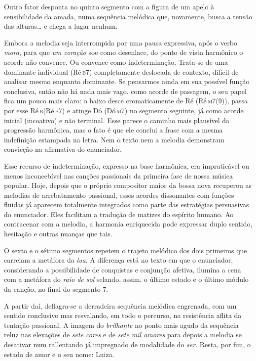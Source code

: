 
Outro fator desponta no quinto segmento com a figura de um apelo à
sensibilidade da amada, numa sequência melódica que, novamente, busca a
tensão das alturas\ldots{} e chega a lugar nenhum.


Embora a melodia seja interrompida por uma pausa expressiva, após o
verbo \textit{mora}, para que \textit{um coração} soe como desenlace, do ponto de
vista harmônico o acorde não convence. Ou convence como indeterminação.
Trata-se de uma dominante individual (Ré\,\textsc{b7}) completamente deslocada de
contexto, difícil de analisar mesmo enquanto dominante. Se pensarmos
ainda em sua possível função conclusiva, então não há nada mais vago.
como acorde de passagem, o seu papel fica um pouco mais claro: o baixo
desce cromaticamente de Ré (Ré\,\textsc{m7(9)}), passa por esse Ré\,\textsc{b}(Ré\,\textsc{b7}) e atinge
Dó (Dó\,\textsc{m7}) no segmento seguinte, já como acorde inicial (incoativo) e não
terminal. Esse parece o caminho mais plausível da progressão harmônica,
mas o fato é que ele conclui a frase com a mesma indefinição estampada
na letra. Nem o texto nem a melodia demonstram convicção na afirmativa
do enunciador.

Esse recurso de indeterminação, expresso na base harmônica, era
impraticável ou menos inconcebível nas canções passionais da primeira
fase de nossa música popular. Hoje, depois que o próprio compositor
maior da bossa nova recuperou as melodias de arrebatamento passional,
esses acordes dissonantes com funções fluidas já aparecem totalmente
integrados como parte das estratégias persuasivas do enunciador. Eles
facilitam a tradução de matizes do espírito humano. Ao contracenar com a
melodia, a harmonia enriquecida pode expressar duplo sentido, hesitação
e outras nuanças que tais.

O sexto e o sétimo segmentos repetem o trajeto melódico dos dois
primeiros que carreiam a metáfora da \textit{lua}. A diferença está no texto
em que o enunciador, considerando a possibilidade de conquistas e
conjunção afetiva, ilumina a cena com a metáfora do \textit{raio de sol}
selando, assim, o último estado e o último módulo da canção, no final do
segmento 7.


A partir daí, deflagra-se a derradeira sequência melódica engrenada, com
um sentido conclusivo mas resvalando, em todo o percurso, na resistência
aflita da tentação passional. A imagem do \textit{brilhante} no ponto mais
agudo da sequência reluz nas elevações de \textit{sete cores} e de \textit{sete mil
amores} para depois a melodia se desativar num rallentando já
impregnado de modalidade do \textit{ser}. Resta, por fim, o estado de amor e o
seu nome: Luiza.

